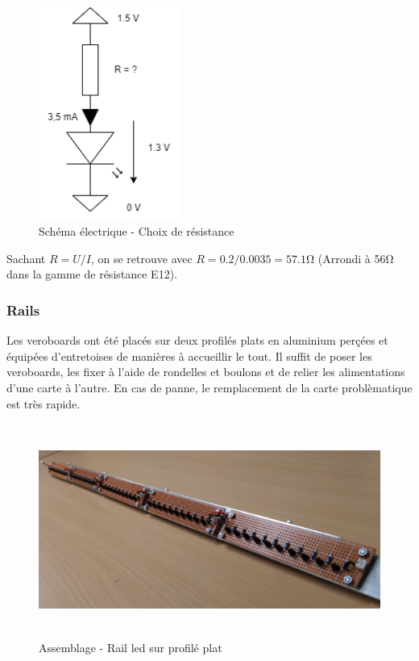 \begin{figure}[H]
    \centering
    \includegraphics[height=7cm]{assets/figures/schema_led_res.png}
    \caption{Schéma électrique - Choix de résistance}
\end{figure}

Sachant \(R = U / I\), on se retrouve avec \(R = 0.2 / 0.0035 = 57.1 \si{\ohm} \) (Arrondi à 56\si{\ohm} dans la gamme de résistance E12).

\subsubsection{Rails}
Les veroboards ont été placés sur deux profilés plats en aluminium perçées et équipées d'entretoises de manières à accueillir le tout. Il suffit de poser les veroboards,
les fixer à l'aide de rondelles et boulons et de relier les alimentations d'une carte à l'autre. En cas de panne, le remplacement de la carte problèmatique est très rapide.

\begin{figure}[H]
    \centering
    \includegraphics[height=7cm]{assets/figures/rail_alu_led.jpg}
    \caption{Assemblage - Rail led sur profilé plat}
\end{figure}

